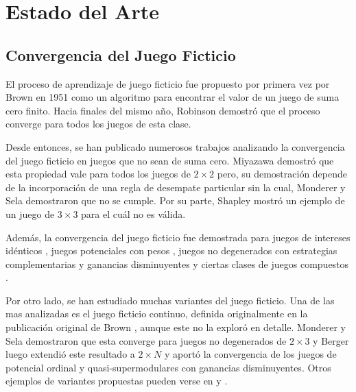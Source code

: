 \chapter{Estado del Arte}  \label{cap:relwork}

\section{Convergencia del Juego Ficticio}

El proceso de aprendizaje de juego ficticio fue propuesto por primera vez por Brown en 1951 \cite{brown:1951} como un algoritmo para encontrar el valor de un juego de suma cero finito. Hacia finales del mismo año, Robinson \cite{robinson:zerosum} demostró que el proceso converge para todos los juegos de esta clase.

Desde entonces, se han publicado numerosos trabajos analizando la convergencia del juego ficticio en juegos que no sean de suma cero. Miyazawa \cite{miyazawa:2x2} demostró que esta propiedad vale para todos los juegos de $2 \times 2$ pero, su demostración depende de la incorporación de una regla de desempate particular sin la cual, Monderer y Sela \cite{2x2:without} demostraron que no se cumple. Por su parte, Shapley \cite{shapley:3x3} mostró un ejemplo de un juego de $3 \times 3$ para el cuál no es válida.

Además, la convergencia del juego ficticio fue demostrada para juegos de intereses idénticos \cite{identical:interests}, juegos potenciales con pesos \cite{weighted:potential}, juegos no degenerados con estrategias complementarias y ganancias disminuyentes \cite{strategic:complementarities} y ciertas clases de juegos compuestos \cite{compound}.

Por otro lado, se han estudiado muchas variantes del juego ficticio. Una de las mas analizadas es el juego ficticio continuo, definida originalmente en la publicación original de Brown \cite{brown:1951}, aunque este no la exploró en detalle. Monderer y Sela \cite{no:cycling} demostraron que esta converge para juegos no degenerados de $2 \times 3$ y Berger luego extendió este resultado a $2 \times N$ \cite{berger:2xn} y aportó la convergencia de los juegos de potencial ordinal y quasi-supermodulares con ganancias disminuyentes. Otros ejemplos de variantes propuestas pueden verse en \cite{pattern:recog} y \cite{new:kind:fp}. 

